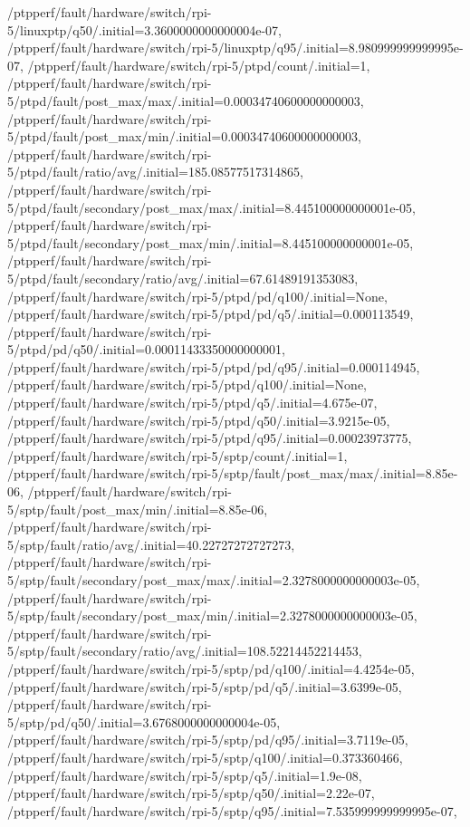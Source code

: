 {    /ptpperf/fault/hardware/switch/rpi-5/linuxptp/q50/.initial=3.3600000000000004e-07,
    /ptpperf/fault/hardware/switch/rpi-5/linuxptp/q95/.initial=8.980999999999995e-07,
    /ptpperf/fault/hardware/switch/rpi-5/ptpd/count/.initial=1,
    /ptpperf/fault/hardware/switch/rpi-5/ptpd/fault/post_max/max/.initial=0.00034740600000000003,
    /ptpperf/fault/hardware/switch/rpi-5/ptpd/fault/post_max/min/.initial=0.00034740600000000003,
    /ptpperf/fault/hardware/switch/rpi-5/ptpd/fault/ratio/avg/.initial=185.08577517314865,
    /ptpperf/fault/hardware/switch/rpi-5/ptpd/fault/secondary/post_max/max/.initial=8.445100000000001e-05,
    /ptpperf/fault/hardware/switch/rpi-5/ptpd/fault/secondary/post_max/min/.initial=8.445100000000001e-05,
    /ptpperf/fault/hardware/switch/rpi-5/ptpd/fault/secondary/ratio/avg/.initial=67.61489191353083,
    /ptpperf/fault/hardware/switch/rpi-5/ptpd/pd/q100/.initial=None,
    /ptpperf/fault/hardware/switch/rpi-5/ptpd/pd/q5/.initial=0.000113549,
    /ptpperf/fault/hardware/switch/rpi-5/ptpd/pd/q50/.initial=0.00011433350000000001,
    /ptpperf/fault/hardware/switch/rpi-5/ptpd/pd/q95/.initial=0.000114945,
    /ptpperf/fault/hardware/switch/rpi-5/ptpd/q100/.initial=None,
    /ptpperf/fault/hardware/switch/rpi-5/ptpd/q5/.initial=4.675e-07,
    /ptpperf/fault/hardware/switch/rpi-5/ptpd/q50/.initial=3.9215e-05,
    /ptpperf/fault/hardware/switch/rpi-5/ptpd/q95/.initial=0.00023973775,
    /ptpperf/fault/hardware/switch/rpi-5/sptp/count/.initial=1,
    /ptpperf/fault/hardware/switch/rpi-5/sptp/fault/post_max/max/.initial=8.85e-06,
    /ptpperf/fault/hardware/switch/rpi-5/sptp/fault/post_max/min/.initial=8.85e-06,
    /ptpperf/fault/hardware/switch/rpi-5/sptp/fault/ratio/avg/.initial=40.22727272727273,
    /ptpperf/fault/hardware/switch/rpi-5/sptp/fault/secondary/post_max/max/.initial=2.3278000000000003e-05,
    /ptpperf/fault/hardware/switch/rpi-5/sptp/fault/secondary/post_max/min/.initial=2.3278000000000003e-05,
    /ptpperf/fault/hardware/switch/rpi-5/sptp/fault/secondary/ratio/avg/.initial=108.52214452214453,
    /ptpperf/fault/hardware/switch/rpi-5/sptp/pd/q100/.initial=4.4254e-05,
    /ptpperf/fault/hardware/switch/rpi-5/sptp/pd/q5/.initial=3.6399e-05,
    /ptpperf/fault/hardware/switch/rpi-5/sptp/pd/q50/.initial=3.6768000000000004e-05,
    /ptpperf/fault/hardware/switch/rpi-5/sptp/pd/q95/.initial=3.7119e-05,
    /ptpperf/fault/hardware/switch/rpi-5/sptp/q100/.initial=0.373360466,
    /ptpperf/fault/hardware/switch/rpi-5/sptp/q5/.initial=1.9e-08,
    /ptpperf/fault/hardware/switch/rpi-5/sptp/q50/.initial=2.22e-07,
    /ptpperf/fault/hardware/switch/rpi-5/sptp/q95/.initial=7.535999999999995e-07,
}
